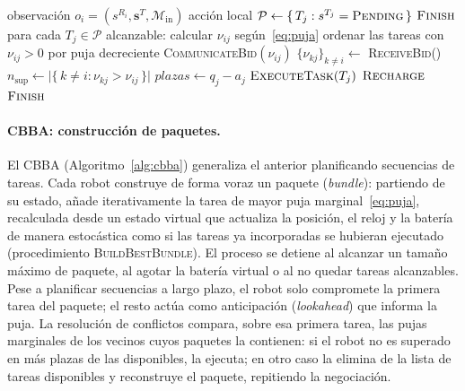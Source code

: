 \begin{algorithm}
\caption{\textsc{CBAA} --- decisión de $R_i$ en un instante de decisión}
\label{alg:cbaa}
\begin{algorithmic}[1]
\Require observación $o_i=(s^{R_i},\mathbf{s}^{T},\mathcal{M}_{\mathrm{in}})$
\Ensure acción local
\State $\mathcal{P} \gets \{\,T_j : s^{T_j}=\textsc{Pending}\,\}$
 \Return $\textsc{Finish}$ \EndIf
\State para cada $T_j\in\mathcal{P}$ alcanzable: calcular $\nu_{ij}$ según~\eqref{eq:puja}
\State ordenar las tareas con $\nu_{ij}>0$ por puja decreciente
    \State \textsc{CommunicateBid}$(\nu_{ij})$
    \State $\{\nu_{kj}\}_{k\neq i} \gets$ \textsc{ReceiveBid}() 
    \State $n_{\mathrm{sup}} \gets \big|\{\,k\neq i : \nu_{kj}>\nu_{ij}\,\}\big|$ 
    \State $\textit{plazas} \gets q_j - a_j$
        \State \Return $\textsc{ExecuteTask}(T_j)$ 
    \EndIf
\EndFor
{} \Return $\textsc{Recharge}$
\Else{} \Return $\textsc{Finish}$ \EndIf
\end{algorithmic}
\end{algorithm}

\paragraph{CBBA: construcción de paquetes.} El CBBA (Algoritmo~\ref{alg:cbba}) generaliza el anterior planificando secuencias de tareas. Cada robot construye de forma voraz un paquete (\textit{bundle}): partiendo de su estado, añade iterativamente la tarea de mayor puja marginal~\eqref{eq:puja}, recalculada desde un estado virtual que actualiza la posición, el reloj y la batería de manera estocástica como si las tareas ya incorporadas se hubieran ejecutado (procedimiento \textsc{BuildBestBundle}). El proceso se detiene al alcanzar un tamaño máximo de paquete, al agotar la batería virtual o al no quedar tareas alcanzables. Pese a planificar secuencias a largo plazo, el robot solo compromete la primera tarea del paquete; el resto actúa como anticipación (\textit{lookahead}) que informa la puja. La resolución de conflictos compara, sobre esa primera tarea, las pujas marginales de los vecinos cuyos paquetes la contienen: si el robot no es superado en más plazas de las disponibles, la ejecuta; en otro caso la elimina de la lista de tareas disponibles y reconstruye el paquete, repitiendo la negociación.

